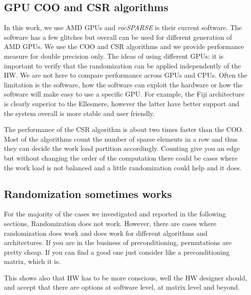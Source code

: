\documentclass[manuscript,screen]{acmart}
\begin{document}
\subsection{GPU COO and CSR algorithms}
\label{sec:gpucoocsr}
In this work, we use AMD GPUs and {\em rocSPARSE} is their current
software. The software has a few glitches but overall can be used for
different generation of AMD GPUs. We use the COO and CSR algorithms
and we provide performance measure for double precision only. The
ideas of using different GPUs: it is important to verify that the
randomization can be applied independently of the HW. We are not here
to compare performance across GPUs and CPUs. Often the limitation is
the software, how the software can exploit the hardware or how the
software will make easy to use a specific GPU. For example, the Fiji
architecture is clearly superior to the Ellesmere, however the latter
have better support and the system overall is more stable and user
friendly.

The performance of the CSR algorithm is about two times faster than the
COO. Most of the algorithms count the number of sparse elements in a
row and thus they can decide the work load partition
accordingly. Counting give you an edge but without changing the order
of the computation there could be cases where the work load is not
balanced and a little randomization could help and it does.

\subsection{Randomization sometimes works}

For the majority of the cases we investigated and reported in the
following sections, Randomization does not work. However, there are
cases where randomization does work and does work for different
algorithms and architectures. If you are in the business of
preconditioning, permutations are pretty cheap. If you can find a good
one just consider like a preconditioning matrix, which it is. 

This shows also that HW has to be more conscious, well the HW designer
should, and accept that there are options at software level, at matrix
level and beyond. 


\end{document}
